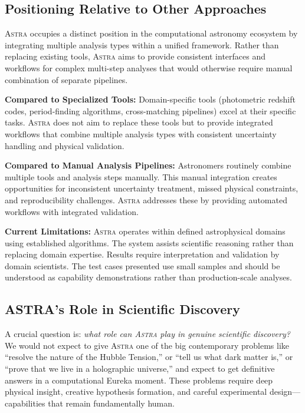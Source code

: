 \documentclass[fleqn,usenatbib]{mnras}
\newcommand{\astra}{\textsc{Astra}\xspace}
\begin{document}
\subsection{Positioning Relative to Other Approaches}
\label{sec:discussion:positioning}

\astra occupies a distinct position in the computational astronomy ecosystem by integrating multiple analysis types within a unified framework.
Rather than replacing existing tools, \astra aims to provide consistent interfaces and workflows for complex multi-step analyses that would otherwise require manual combination of separate pipelines.

\textbf{Compared to Specialized Tools:}
Domain-specific tools (photometric redshift codes, period-finding algorithms, cross-matching pipelines) excel at their specific tasks.
\astra does not aim to replace these tools but to provide integrated workflows that combine multiple analysis types with consistent uncertainty handling and physical validation.

\textbf{Compared to Manual Analysis Pipelines:}
Astronomers routinely combine multiple tools and analysis steps manually.
This manual integration creates opportunities for inconsistent uncertainty treatment, missed physical constraints, and reproducibility challenges.
\astra addresses these by providing automated workflows with integrated validation.

\textbf{Current Limitations:}
\astra operates within defined astrophysical domains using established algorithms.
The system assists scientific reasoning rather than replacing domain expertise.
Results require interpretation and validation by domain scientists.
The test cases presented use small samples and should be understood as capability demonstrations rather than production-scale analyses.

\subsection{ASTRA's Role in Scientific Discovery}
\label{sec:discussion:role}

A crucial question is: \emph{what role can \astra play in genuine scientific discovery?}
We would not expect to give \astra one of the big contemporary problems like ``resolve the nature of the Hubble Tension,'' or ``tell us what dark matter is,'' or ``prove that we live in a holographic universe,'' and expect to get definitive answers in a computational Eureka moment.
These problems require deep physical insight, creative hypothesis formation, and careful experimental design---capabilities that remain fundamentally human.
\end{document}
